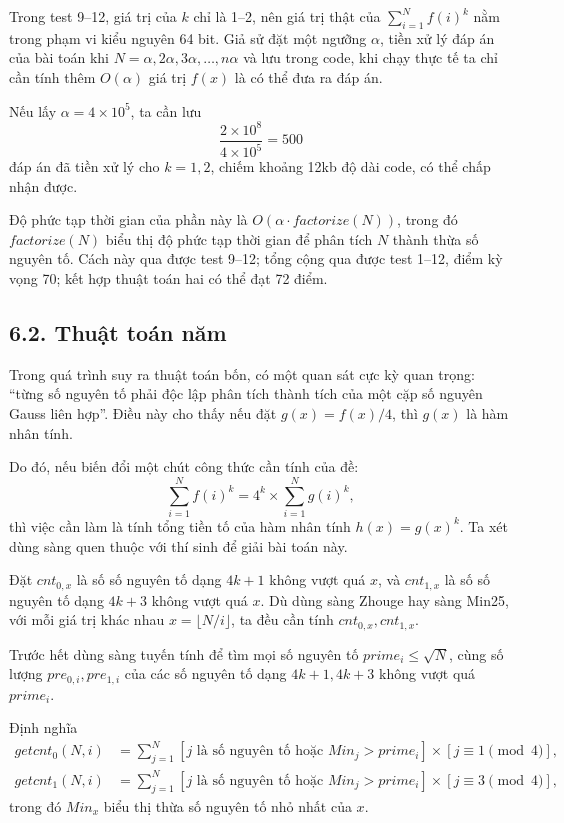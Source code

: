 \documentclass[11pt]{article}
\begin{document}
Trong test 9--12, giá trị của \(k\) chỉ là 1--2, nên giá trị thật của
\(\sum_{i=1}^{N} f(i)^k\) nằm trong phạm vi kiểu nguyên 64 bit. Giả sử đặt một
ngưỡng \(\alpha\), tiền xử lý đáp án của bài toán khi
\(N=\alpha,2\alpha,3\alpha,\ldots,n\alpha\) và lưu trong code, khi chạy thực tế
ta chỉ cần tính thêm \(O(\alpha)\) giá trị \(f(x)\) là có thể đưa ra đáp án.

Nếu lấy \(\alpha=4\times10^5\), ta cần lưu
\[
  \frac{2\times10^8}{4\times10^5}=500
\]
đáp án đã tiền xử lý cho \(k=1,2\), chiếm khoảng 12kb độ dài code, có thể chấp
nhận được.

Độ phức tạp thời gian của phần này là \(O(\alpha\cdot factorize(N))\), trong
đó \(factorize(N)\) biểu thị độ phức tạp thời gian để phân tích \(N\) thành
thừa số nguyên tố. Cách này qua được test 9--12; tổng cộng qua được test
1--12, điểm kỳ vọng 70; kết hợp thuật toán hai có thể đạt 72 điểm.

\subsection*{6.2. Thuật toán năm}

Trong quá trình suy ra thuật toán bốn, có một quan sát cực kỳ quan trọng:
``từng số nguyên tố phải độc lập phân tích thành tích của một cặp số nguyên
Gauss liên hợp''. Điều này cho thấy nếu đặt \(g(x)=f(x)/4\), thì \(g(x)\) là
hàm nhân tính.

Do đó, nếu biến đổi một chút công thức cần tính của đề:
\[
  \sum_{i=1}^{N} f(i)^k=4^k\times\sum_{i=1}^{N} g(i)^k,
\]
thì việc cần làm là tính tổng tiền tố của hàm nhân tính \(h(x)=g(x)^k\). Ta
xét dùng sàng quen thuộc với thí sinh để giải bài toán này.

Đặt \(cnt_{0,x}\) là số số nguyên tố dạng \(4k+1\) không vượt quá \(x\), và
\(cnt_{1,x}\) là số số nguyên tố dạng \(4k+3\) không vượt quá \(x\). Dù dùng
sàng Zhouge hay sàng Min25, với mỗi giá trị khác nhau \(x=\lfloor N/i\rfloor\),
ta đều cần tính \(cnt_{0,x},cnt_{1,x}\).

Trước hết dùng sàng tuyến tính để tìm mọi số nguyên tố \(prime_i\le\sqrt N\),
cùng số lượng \(pre_{0,i},pre_{1,i}\) của các số nguyên tố dạng \(4k+1,4k+3\)
không vượt quá \(prime_i\).

Định nghĩa
\[
\begin{aligned}
getcnt_0(N,i)
  &=\sum_{j=1}^{N}[j\text{ là số nguyên tố hoặc }Min_j>prime_i]
      \times[j\equiv1\pmod4],\\
getcnt_1(N,i)
  &=\sum_{j=1}^{N}[j\text{ là số nguyên tố hoặc }Min_j>prime_i]
      \times[j\equiv3\pmod4],
\end{aligned}
\]
trong đó \(Min_x\) biểu thị thừa số nguyên tố nhỏ nhất của \(x\).
\end{document}

